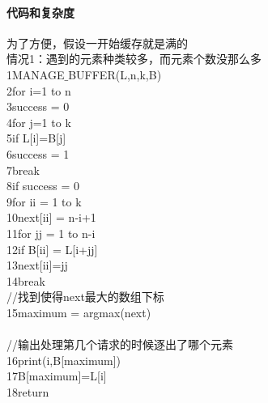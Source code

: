 \documentclass{article}
\begin{document}
\begin{CJK}{UTF8}{gkai}
\paragraph{代码和复杂度}
为了方便，假设一开始缓存就是满的\\
情况1：遇到的元素种类较多，而元素个数没那么多\\
1\qquad MANAGE$\_$BUFFER(L,n,k,B)\\
2\qquad for i=1 to n\\
3\qquad\qquad success = 0\\
4\qquad\qquad for j=1 to k\\
5\qquad\qquad\qquad if L[i]=B[j]\\
6\qquad\qquad\qquad\qquad success = 1\\
7\qquad\qquad\qquad\qquad break\\
8\qquad\qquad if success = 0\\
9\qquad\qquad \qquad for ii = 1 to k\\
10\qquad\qquad\qquad\qquad next[ii] = n-i+1\\
11\qquad\qquad\qquad\qquad for jj = 1 to n-i\\
12\qquad\qquad\qquad\qquad\qquad if B[ii] = L[i+jj]\\
13\qquad\qquad\qquad\qquad\qquad\qquad next[ii]=jj\\
14\qquad\qquad\qquad\qquad\qquad\qquad break\\
//找到使得next最大的数组下标\\
15\qquad\qquad\qquad maximum = argmax(next)\\
\\
//输出处理第几个请求的时候逐出了哪个元素\\
16\qquad\qquad\qquad print(i,B[maximum])\\
17\qquad\qquad\qquad B[maximum]=L[i]\\
18\qquad return \\


\end{CJK}
\end{document}
